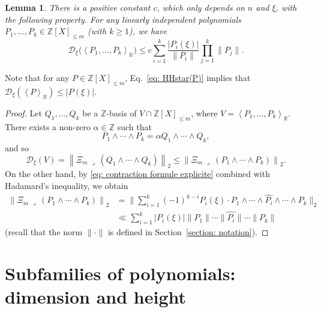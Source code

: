 \documentclass[JEP,XML,SOM,Unicode,NoFloatCountersInSection,published]{cedram}
\newcommand\bR{\mathbb{R}}
\newcommand\bZ{\mathbb{Z}}
\newcommand\HHstar{\mathcal{D}_{\xi}}
\newcommand{\norm}[1]{\left\|#1 \right\|_2}
\newcommand{\bnorm}[1]{\biggl\|#1 \biggr\|_2}
\newcommand{\normH}[1]{\|#1\|}
\newcommand{\Vect}[2][]{\left\la #2\right\ra_{#1}}
\let\la\langle
\let\ra\rangle
\theoremstyle{definition}
\theoremstyle{plain}
\newtheorem{Lem}[Def]{Lemma}
\begin{document}
\begin{Lem}
\label{lem: estimation des pseudo resultant tordus}
There is a positive constant $c$, which only depends on $n$ and $\xi$, with the following property. For any linearly independent polynomials $P_1,\dots,P_k\in\bZ[X]_{\leq m}$ (with $k\geq 1$), we have
\begin{equation}
\label{eq: estimation L_xi(V) avec T}
\HHstar\big(\Vect[\bR]{P_1,\dots,P_k} \big) \leq c \sum_{i=1}^{k} \frac{|P_i(\xi)|}{\normH{P_i}} \prod_{j=1}^{k} \normH{P_j}.
\end{equation}
\end{Lem}
Note that for any $P\in\bZ[X]_{\leq m}$, Eq.~\eqref{eq: HHstar(P)} implies that $\HHstar(\Vect[\bR]{P}) \leq |P(\xi)|$.

\begin{proof}
Let $Q_1,\dots,Q_k$ be a $\bZ$-basis of $V\cap\bZ[X]_{\leq m}$, where $V=\Vect[\bR]{P_1,\dots,P_k}$. There exists a non-zero $\alpha\in\bZ$ such that
\[
P_1\wedge \cdots \wedge P_k = \alpha Q_1\wedge \cdots \wedge Q_k,
\]
and so
\[
\HHstar(V) = \norm{ \Xi_m\,\lrcorner \,(Q_1\wedge \cdots \wedge Q_k)} \leq \norm{ \Xi_m\,\lrcorner \,(P_1\wedge \cdots \wedge P_k)}.
\]
On the other hand, by \eqref{eq: contraction formule explicite} combined with Hadamard's inequality, we obtain
\begin{align*}
\norm{\Xi_m\,\lrcorner \,(P_1\wedge \cdots \wedge P_k)} & = \bnorm{\sum_{i=1}^{k} (-1)^{k-i} P_i(\xi) \cdot P_1\wedge \cdots \wedge \widehat{P_i} \wedge \cdots \wedge P_k } \\
& \ll \sum_{i=1}^{k} |P_i(\xi)| \normH{P_1}\cdots \widehat{\normH{P_i}} \cdots \normH{P_k}
\end{align*}
(recall that the norm $\normH{\cdot}$ is defined in Section~\ref{section: notation}).
\end{proof}

\section{Subfamilies of polynomials: dimension and height}
\label{section : indpce lineaire Q_i}
\end{document}

